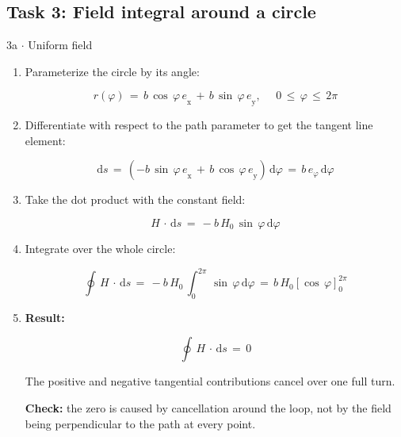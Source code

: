 \documentclass[11pt]{article}
\begin{document}
\begin{keepsection}\subsection{Task 3: Field integral around a circle}

\begin{workedbox}{3a \ensuremath{\cdot} Uniform field}
\begin{enumerate}
\item {}
Parameterize the circle by its angle:

\begin{equation*}{r}({φ})\, =\, {b}\, \cos \, {φ\,e}_{\mathrm{x}}\, +\, {b}\, \sin \, {φ\,e}_{\mathrm{y}},\, \quad \, 0\, \leq \, {φ}\, \leq \, 2π\end{equation*}
\item {}
Differentiate with respect to the path parameter to get the tangent line element:

\begin{equation*}\mathrm{d}{s}\, =\, (-{b}\, \sin \, {φ\,e}_{\mathrm{x}}\, +\, {b}\, \cos \, {φ\,e}_{\mathrm{y}})\, \mathrm{d}{φ}\, =\, {b\,e}_{φ}\, \mathrm{d}{φ}\end{equation*}
\item {}
Take the dot product with the constant field:

\begin{equation*}{H}\, \cdot \, \mathrm{d}{s}\, =\, -{b\,H}_{0}\, \sin \, {φ}\, \mathrm{d}{φ}\end{equation*}
\item {}
Integrate over the whole circle:

\begin{equation*}\oint \, {H}\, \cdot \, \mathrm{d}{s}\, =\, -{b\,H}_{0}\, \int_{0}^{2π} \, \sin \, {φ}\, \mathrm{d}{φ}\, =\, {b\,H}_{0}[\cos \, {φ}]_{0}^{2π}\end{equation*}
\item {}
\textbf{Result:}

\begin{equation*}\oint \, {H}\, \cdot \, \mathrm{d}{s}\, =\, 0\end{equation*}

The positive and negative tangential contributions cancel over one full turn.

\textbf{Check:} the zero is caused by cancellation around the loop, not by the field being perpendicular to the path at every point.
\end{enumerate}
\end{workedbox}

\end{keepsection}
\end{document}
